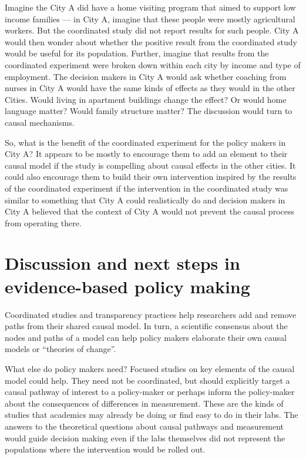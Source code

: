\documentclass[
  11pt,
]{article}
\begin{document}
Imagine the City A did have a home visiting program that aimed to
support low income families --- in City A, imagine that these people
were mostly agricultural workers. But the coordinated study did not
report results for such people. City A would then wonder about whether
the positive result from the coordinated study would be useful for its
population. Further, imagine that results from the coordinated
experiment were broken down within each city by income and type of
employment. The decision makers in City A would ask whether coaching
from nurses in City A would have the same kinds of effects as they would
in the other Cities. Would living in apartment buildings change the
effect? Or would home language matter? Would family structure matter?
The discussion would turn to causal mechanisms.

So, what is the benefit of the coordinated experiment for the policy
makers in City A? It appears to be mostly to encourage them to add an
element to their causal model if the study is compelling about causal
effects in the other cities. It could also encourage them to build their
own intervention inspired by the results of the coordinated experiment
if the intervention in the coordinated study was similar to something
that City A could realistically do and decision makers in City A
believed that the context of City A would not prevent the causal process
from operating there.

\hypertarget{discussion-and-next-steps-in-evidence-based-policy-making}{%
\section{Discussion and next steps in evidence-based policy
making}\label{discussion-and-next-steps-in-evidence-based-policy-making}}

Coordinated studies and transparency practices help researchers add and
remove paths from their shared causal model. In turn, a scientific
consensus about the nodes and paths of a model can help policy makers
elaborate their own causal models or ``theories of change''.

What else do policy makers need? Focused studies on key elements of the
causal model could help. They need not be coordinated, but should
explicitly target a causal pathway of interest to a policy-maker or
perhaps inform the policy-maker about the consequences of differences in
measurement. These are the kinds of studies that academics may already
be doing or find easy to do in their labs. The answers to the
theoretical questions about causal pathways and measurement would guide
decision making even if the labs themselves did not represent the
populations where the intervention would be rolled out.
\end{document}
